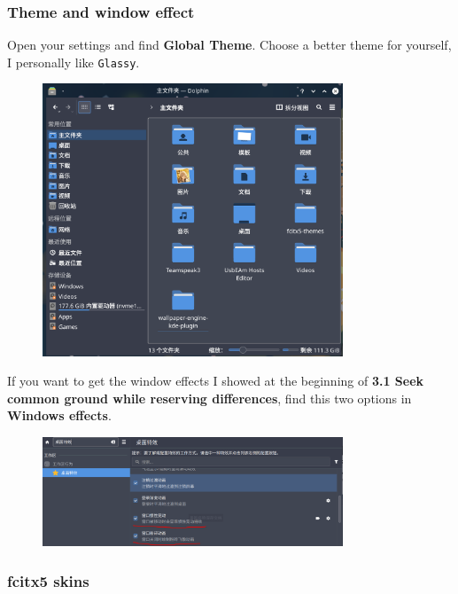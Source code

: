 \documentclass[12pt]{ctexart}
\begin{document}
\subsubsection*{\textbf{Theme and window effect}}

Open your settings and find \textbf{Global Theme}. Choose a better theme
for yourself, I personally like \texttt{Glassy}.

\begin{figure}[H]
    \centering
    \includegraphics[width=0.8\textwidth,keepaspectratio]{assets/Linux/3.2 Decorate your own garden/5.png}
\end{figure}


If you want to get the window effects I showed at the beginning of
\textbf{3.1 Seek common ground while reserving differences}, find this
two options in \textbf{Windows effects}.

\begin{figure}[H]
    \centering
    \includegraphics[width=0.8\textwidth,keepaspectratio]{assets/Linux/3.2 Decorate your own garden/6.png}
\end{figure}


\subsubsection*{\textbf{fcitx5 skins}}
\end{document}
